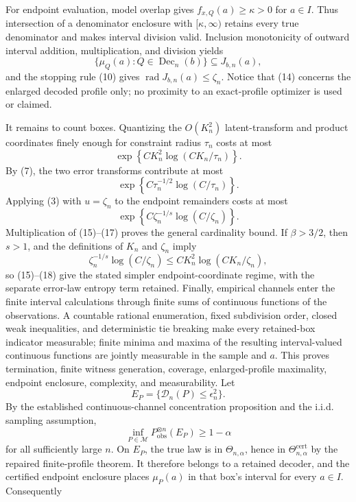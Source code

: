 For endpoint evaluation, model overlap gives \(f_{x,Q}(a)\ge\kappa>0\) for \(a\in I\).  Thus intersection of a denominator enclosure with \([\kappa,\infty)\) retains every true denominator and makes interval division valid.  Inclusion monotonicity of outward interval addition, multiplication, and division yields
\[
 \{\mu_Q(a):Q\in\operatorname{Dec}_n(b)\}
 \subseteq J_{b,n}(a),                                      \tag{14}
\]
and the stopping rule (10) gives \(\operatorname{rad}J_{b,n}(a)\le\zeta_n\).  Notice that (14) concerns the enlarged decoded profile only; no proximity to an exact-profile optimizer is used or claimed.

It remains to count boxes.  Quantizing the \(O(K_n^2)\) latent-transform and product coordinates finely enough for constraint radius \(\tau_n\) costs at most
\[
 \exp\left\{C K_n^2\log(CK_n/\tau_n)\right\}.               \tag{15}
\]
By (7), the two error transforms contribute at most
\[
 \exp\left\{C\tau_n^{-1/2}\log(C/\tau_n)\right\}.           \tag{16}
\]
Applying (3) with \(u=\zeta_n\) to the endpoint remainders costs at most
\[
 \exp\left\{C\zeta_n^{-1/s}\log(C/\zeta_n)\right\}.         \tag{17}
\]
Multiplication of (15)--(17) proves the general cardinality bound.  If \(\beta>3/2\), then \(s>1\), and the definitions of \(K_n\) and \(\zeta_n\) imply
\[
 \zeta_n^{-1/s}\log(C/\zeta_n)
 \le C K_n^2\log(CK_n/\zeta_n),                             \tag{18}
\]
so (15)--(18) give the stated simpler endpoint-coordinate regime, with the separate error-law entropy term retained.  Finally, empirical channels enter the finite interval calculations through finite sums of continuous functions of the observations.  A countable rational enumeration, fixed subdivision order, closed weak inequalities, and deterministic tie breaking make every retained-box indicator measurable; finite minima and maxima of the resulting interval-valued continuous functions are jointly measurable in the sample and \(a\).  This proves termination, finite witness generation, coverage, enlarged-profile maximality, endpoint enclosure, complexity, and measurability.
Let
\[
 E_P=\{\mathscr D_n(P)\le\epsilon_n^2\}.
\]
By the established continuous-channel concentration proposition and the i.i.d. sampling assumption,
\[
 \inf_{P\in\mathcal M}P_{\mathrm{obs}}^{\otimes n}(E_P)
 \ge1-\alpha                                                   \tag{15}
\]
for all sufficiently large \(n\).  On \(E_P\), the true law is in \(\Theta_{n,\alpha}\), hence in \(\Theta^{\mathrm{cert}}_{n,\alpha}\) by the repaired finite-profile theorem.  It therefore belongs to a retained decoder, and the certified endpoint enclosure places \(\mu_P(a)\) in that box's interval for every \(a\in I\).  Consequently
